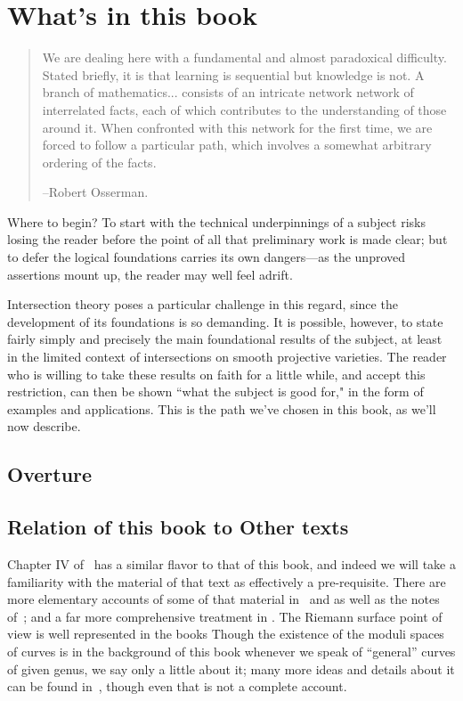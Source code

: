 \section{What's in this book}


\begin{quote}
\small\sf
We are dealing here with a fundamental and almost paradoxical difficulty. Stated briefly, it is that learning is sequential but knowledge is not. A branch of mathematics... consists of an intricate network network of interrelated facts, each of which contributes to the understanding of those around it. When confronted with this network for the first time, we are forced to follow a particular path, which involves a somewhat arbitrary ordering of the facts.

--Robert Osserman.

\end{quote}



Where to begin? To start with the technical underpinnings of a subject risks losing the reader before the point of all that preliminary work is made clear; but to defer the logical foundations carries its own dangers---as the unproved assertions mount up, the reader may well feel adrift.

Intersection theory poses a particular challenge in this regard, since the development of its foundations is so demanding. It is possible, however, to state fairly simply and precisely the main foundational results of the subject, at least in the limited context of intersections on smooth projective varieties. The reader who is willing to take these results on faith for a little while, and accept this restriction, can then be shown ``what the subject is good for," in the form of examples and applications. This is the path we've chosen in this book, as we'll now describe.

\subsection{Overture}



\subsection{Relation of this book to Other texts} 
Chapter IV of~\cite{Hartshorne1977} has a similar flavor to that of this book, and indeed we will take a familiarity with the material of that text as effectively a pre-requisite.
There are more elementary accounts of some of that material in~\cite{ Fulton **** } and \cite{Walker} as well as the notes of~\cite{Griffiths***}; and a far more comprehensive treatment in \cite{ACGH}. The Riemann surface point of view is well represented in the books \cites{Forster} \cite{Gunning} \cite{Kirwan}\cite{Miranda}Though the existence of the moduli spaces of curves is in the background of this book whenever we speak of ``general'' curves of given genus, we say only a little about it; many more ideas and details about it can be found in~\cite{Harris-Morrison}, though even that is not a complete account.


